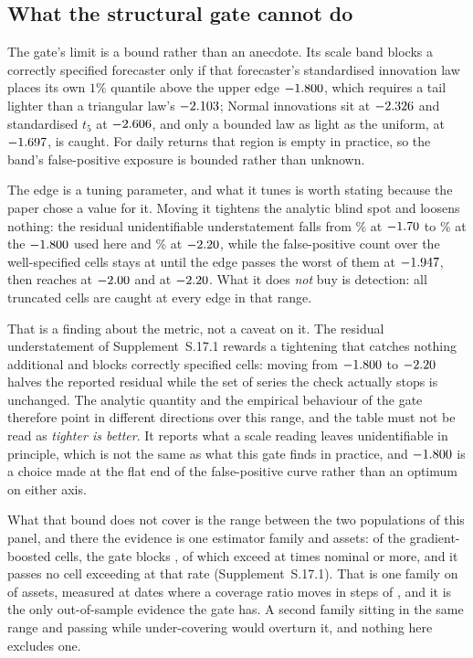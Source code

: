 \documentclass[preprint,11pt,authoryear]{elsarticle}
\newcommand{\1}{\boldsymbol{1}}
\begin{document}
\subsection{What the structural gate cannot do}
\label{sec:gate_limits}

The gate's limit is a bound rather than an anecdote. Its scale band blocks a
correctly specified forecaster only if that forecaster's standardised innovation
law places its own $1\%$ quantile above the upper edge $-1.800$, which
requires a tail lighter than a triangular law's $-2.103$; Normal
innovations sit at $-2.326$ and standardised $t_5$ at $-2.606$,
and only a bounded law as light as the uniform, at $-1.697$, is caught.
For daily returns that region is empty in practice, so the band's false-positive
exposure is bounded rather than unknown.

The edge is a tuning parameter, and what it tunes is worth stating because the
paper chose a value for it. Moving it tightens the analytic blind spot and
loosens nothing: the residual unidentifiable understatement falls from
\nUndBandLoose\% at $-1.70$ to \nGapUndGateNow\% at the $-1.800$ used
here and \nUndBandVeryStrict\% at $-2.20$, while the false-positive
count over the \nBandGoodCells{} well-specified cells stays at
\nBandFPAtNow{} until the edge passes the worst of them at
$-1.947$, then reaches \nBandFPAtStrict{} at $-2.00$ and
\nBandFPAtVeryStrict{} at $-2.20$. What it does \emph{not} buy is
detection: all \nBandTruncCells{} truncated cells are caught at every edge in
that range.

That is a finding about the metric, not a caveat on it. The residual
understatement of Supplement~S.17.1 rewards a tightening that catches nothing
additional and blocks \nBandFPAtVeryStrict{} correctly specified cells: moving
from $-1.800$ to $-2.20$ halves the reported residual while the
set of series the check actually stops is unchanged. The analytic quantity and
the empirical behaviour of the gate therefore point in different directions
over this range, and the table must not be read as \emph{tighter is better}. It
reports what a scale reading leaves unidentifiable in principle, which is not
the same as what this gate finds in practice, and $-1.800$ is a choice
made at the flat end of the false-positive curve rather than an optimum on
either axis.

What that bound does not cover is the range between the two populations of this
panel, and there the evidence is one estimator family and \nMLAssets{} assets:
of the \nMLGbmCells{} gradient-boosted cells, the gate blocks \nMLGbmBlocked, of
which \nMLBlockedUnder{} exceed at \nMLUnderThreshold{} times nominal or more,
and it passes no cell exceeding at that rate (Supplement~S.17.1).
That is one family on \nMLAssets{} of \nMainAssets{} assets, measured at
\nMLDates{} dates where a coverage ratio moves in steps of \nMLPiGrid, and it is
the only out-of-sample evidence the gate has. A second family sitting in the same
range and passing while under-covering would overturn it, and nothing here
excludes one.
\end{document}

